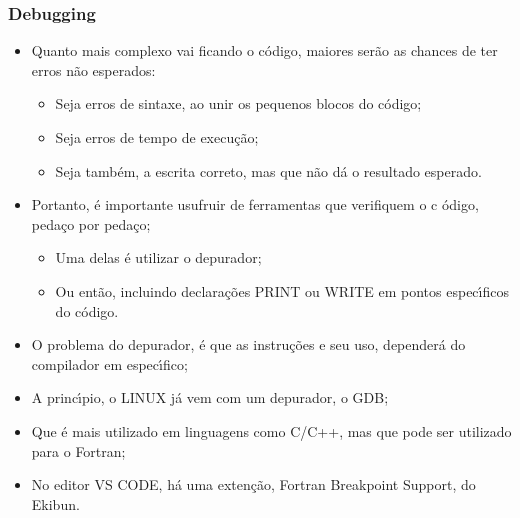 \documentclass[xcolor=table]{beamer}
\newenvironment{stepitemize}{\begin{itemize}[<+->]}{\end{itemize} }
\begin{document}
\begin{frame}%

\frametitle{Debugging}

\begin{stepitemize}
\item Quanto mais complexo vai ficando o c\'{o}digo, maiores ser\~{a}o as
chances de ter erros n\~{a}o esperados:

\begin{itemize}
\item Seja erros de sintaxe, ao unir os pequenos blocos do c\'{o}digo;

\item Seja erros de tempo de execu\c{c}\~{a}o;

\item Seja tamb\'{e}m, a escrita correto, mas que n\~{a}o d\'{a} o resultado
esperado.
\end{itemize}

\item Portanto, \'{e} importante usufruir de ferramentas que verifiquem o c%
\'{o}digo, peda\c{c}o por peda\c{c}o;

\begin{itemize}
\item Uma delas \'{e} utilizar o depurador;

\item Ou ent\~{a}o, incluindo declara\c{c}\~{o}es PRINT ou WRITE em pontos
espec\'{\i}ficos do c\'{o}digo.
\end{itemize}

\item O problema do depurador, \'{e} que as instru\c{c}\~{o}es e seu uso,
depender\'{a} do compilador em espec\'{\i}fico;

\item A princ\'{\i}pio, o LINUX j\'{a} vem com um depurador, o GDB;

\item Que \'{e} mais utilizado em linguagens como C/C++, mas que pode ser
utilizado para o Fortran;

\item No editor VS CODE, h\'{a} uma exten\c{c}\~{a}o, Fortran Breakpoint
Support, do Ekibun.
\end{stepitemize}
\end{frame}
\end{document}
